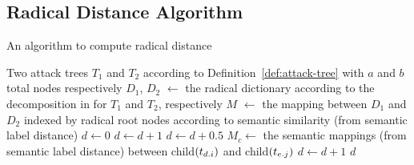 \subsection{Radical Distance Algorithm}
\label{appendix:alg:radical-distance}
\begin{algorithm}[H]
    \caption{An algorithm to compute radical distance}
    \label{alg:recursive-radical}
    \begin{algorithmic}
        \State Two attack trees $T_1$ and $T_2$ according to Definition~\ref{def:attack-tree} with $a$ and $b$ total nodes respectively
\State $D_1$, $D_2$ $\gets$ the radical dictionary according to the decomposition in \cite{schiele2021novel} for $T_1$ and $T_2$, respectively
        \State $M$ $\gets$ the mapping between $D_1$ and $D_2$ indexed by radical root nodes according to semantic similarity (from semantic label distance)
        \State $d \gets 0$
        \State $d \gets d + 1$
        \EndIf
        \State $d \gets d + 0.5$
        \EndIf
        \State $M_c \gets$ the semantic mappings (from semantic label distance) between child$(t_{{d}.{i}})$ and child$(t_{{e}.{j}})$
        \State $d \gets d + 1$
        \EndIf
        \EndIf
        \EndFor
        \EndFor
        \State \Return $d$
    \end{algorithmic}
\end{algorithm}







